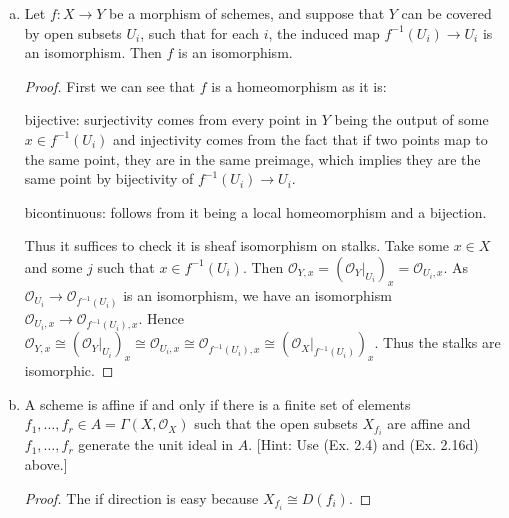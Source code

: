 \begin{exercise}%
\begin{enumerate}[(a)]
	\item Let $f:X\to Y $ be a morphism of schemes, and suppose that $Y $ can be covered by open subsets $U_i $, such that for each $i $, the induced map $f^{-1}(U_i)\to U_i $ is an isomorphism. Then $f $ is an isomorphism.
	\begin{proof}
		First we can see that $f $ is a homeomorphism as it is:

		bijective: surjectivity comes from every point in $Y $ being the output of some $x \in f^{-1}(U_i) $ and injectivity comes from the fact that if two points map to the same point, they are in the same preimage, which implies they are the same point by bijectivity of $f^{-1}(U_i) \to U_i $.

		bicontinuous: follows from it being a local homeomorphism and a bijection.

		Thus it suffices to check it is sheaf isomorphism on stalks.
		Take some $x \in X $ and some $j $ such that $x\in f^{-1}(U_i) $.
		Then $\mathcal{O}_{Y,x} = (\mathcal{O}_{Y}|_{U_i})_x = \mathcal{O}_{U_i,x}$.
		As $\mathcal{O}_{U_i} \to \mathcal{O}_{f^{-1}(U_i)}$ is an isomorphism, we have an isomorphism $\mathcal{O}_{U_i,x} \to \mathcal{O}_{f^{-1}(U_i),x}$.
		Hence $\mathcal{O}_{Y,x} \cong (\mathcal{O}_Y\big|_{U_i})_x \cong \mathcal{O}_{U_i,x}\cong \mathcal{O}_{f^{-1}(U_i),x}\cong (\mathcal{O}_X\big|_{f^{-1}(U_i)})_x$.
		Thus the stalks are isomorphic.
	\end{proof}
	\item A scheme is affine if and only if there is a finite set of elements $f_{1}, \ldots ,f_r \in A = \Gamma(X,\mathcal{O}_X) $ such that the open subsets $X_{f_i} $ are affine and $f_{1}, \ldots ,f_r $ generate the unit ideal in $A $.
		[Hint: Use (Ex. 2.4) and (Ex. 2.16d) above.]
	\begin{proof}
		The if direction is easy because $X_{f_i} \cong D(f_i) $.


\end{proof}
\end{enumerate}
\end{exercise}
